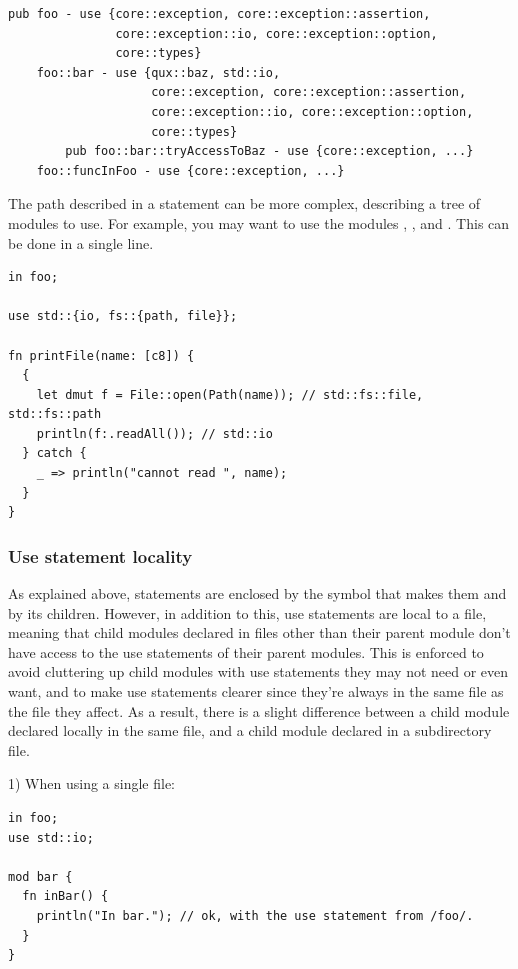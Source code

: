\begin{lstlisting}[caption=\textit{foo.yr.ydump-decls.1}, style=bashVerb, escapechar=@+]
pub foo - use {core::exception, core::exception::assertion,
               core::exception::io, core::exception::option,
               core::types}
    foo::bar - use {qux::baz, std::io,
                    core::exception, core::exception::assertion,
                    core::exception::io, core::exception::option,
                    core::types}
        pub foo::bar::tryAccessToBaz - use {core::exception, ...}
    foo::funcInFoo - use {core::exception, ...}
\end{lstlisting}

The path described in a  statement can be more complex, describing a
tree of modules to use. For example, you may want to use the modules
, , and . This can
be done in a single line.

\begin{lstlisting}[style=coloredverbatim]
in foo;

use std::{io, fs::{path, file}};

fn printFile(name: [c8]) {
  {
    let dmut f = File::open(Path(name)); // std::fs::file, std::fs::path
    println(f:.readAll()); // std::io
  } catch {
    _ => println("cannot read ", name);
  }
}
\end{lstlisting}

\subsubsection*{Use statement locality}

As explained above,  statements are enclosed by the symbol that
makes them and by its children. However, in addition to this, use statements are
local to a file, meaning that child modules declared in files other than their
parent module don't have access to the use statements of their parent modules.
This is enforced to avoid cluttering up child modules with use statements they
may not need or even want, and to make use statements clearer since they're
always in the same file as the file they affect. As a result, there is a slight
difference between a child module declared locally in the same file, and a child
module declared in a subdirectory file.
\smallskip

1) When using a single file:

\begin{lstlisting}[caption=\textit{./foo.yr}, style=coloredverbatim]
in foo;
use std::io;

mod bar {
  fn inBar() {
    println("In bar."); // ok, with the use statement from /foo/.
  }
}
\end{lstlisting}

